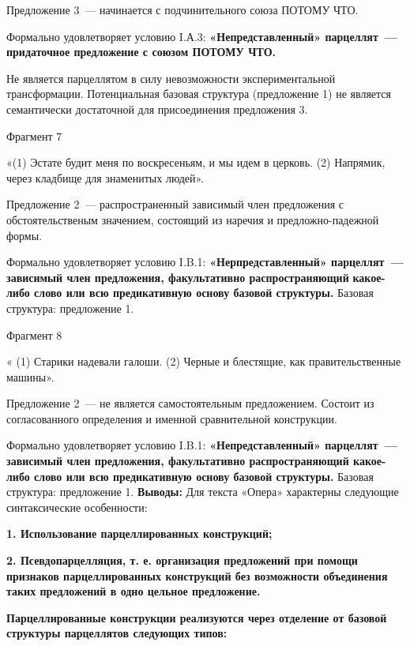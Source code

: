\documentclass{kursa4}
\begin{document}
{{     Предложение 3~--- начинается с подчинительного союза ПОТОМУ ЧТО. 

     Формально удовлетворяет условию I.А.3: \textbf{«Непредставленный»
      парцеллят~--- придаточное предложение с союзом ПОТОМУ ЧТО.} 

     Не является парцеллятом в силу невозможности экспериментальной
      трансформации. Потенциальная базовая структура (предложение 1) не
      является семантически достаточной для присоединения предложения 3. 

     Фрагмент 7

     «(1) Эстате будит меня по воскресеньям, и мы идем в церковь. (2)
      Напрямик, через кладбище для знаменитых людей».

     Предложение 2~--- распространенный зависимый член предложения с
      обстоятельственым значением, состоящий из наречия и предложно-падежной
      формы. 

     Формально удовлетворяет условию I.B.1:
      \textbf{«}\textbf{Нерпредставленный» парцеллят~--- зависимый член
      предложения, факультативно распространяющий }\textbf{какое-либо слово
      или всю предикативную основу базовой структуры. }Базовая структура:
      предложение 1.

     Фрагмент 8

     « (1) Старики надевали галоши. (2) Черные и блестящие, как
      правительственные машины».

     Предложение 2~--- не является самостоятельным предложением. Состоит из
      согласованного определения и именной сравнительной конструкции.

     Формально удовлетворяет условию I.B.1:
      \textbf{«}\textbf{Непредставленный» парцеллят~--- зависимый член
      предложения, факультативно распространяющий какое-либо слово или всю
      предикативную основу базовой структуры.} Базовая структура: предложение 1.
     \textbf{Выводы:} \textmd{Для текста «Опера» характерны следующие
      синтаксические особенности:}

      {\bfseries\color[rgb]{0.2,0.2,0.2}
      \textmd{1. Использование парцеллированных конструкций;}}

      {\bfseries\color[rgb]{0.2,0.2,0.2}
      \textmd{2. Псевдопарцелляция, т. е. организация предложений при
      помощи признаков парцеллированных конструкций }\textmd{без возможности
      объединения таких предложений в одно цельное предложение.}}

      {\bfseries\color[rgb]{0.2,0.2,0.2}
      \textmd{}Парцеллированные конструкции\textmd{ }\textmd{реализуются
      через отделение от базовой структуры парцеллятов следующих
      типов}\textmd{:}}

}}
\end{document}
